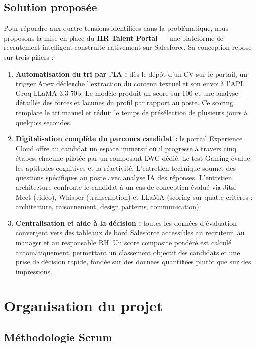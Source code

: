 \subsection{Solution proposée}

Pour répondre aux quatre tensions identifiées dans la problématique, nous proposons la mise en place du \textbf{HR Talent Portal} --- une plateforme de recrutement intelligent construite nativement sur Salesforce. Sa conception repose sur trois piliers :

\begin{enumerate}
    \item \textbf{Automatisation du tri par l'IA :} dès le dépôt d'un CV sur le portail, un trigger Apex déclenche l'extraction du contenu textuel et son envoi à l'API Groq LLaMA 3.3-70b. Le modèle produit un score sur 100 et une analyse détaillée des forces et lacunes du profil par rapport au poste. Ce scoring remplace le tri manuel et réduit le temps de présélection de plusieurs jours à quelques secondes.
    
    \item \textbf{Digitalisation complète du parcours candidat :} le portail Experience Cloud offre au candidat un espace immersif où il progresse à travers cinq étapes, chacune pilotée par un composant LWC dédié. Le test Gaming évalue les aptitudes cognitives et la réactivité. L'entretien technique soumet des questions spécifiques au poste avec analyse IA des réponses. L'entretien architecture confronte le candidat à un cas de conception évalué via Jitsi Meet (vidéo), Whisper (transcription) et LLaMA (scoring sur quatre critères : architecture, raisonnement, design patterns, communication).
    
    \item \textbf{Centralisation et aide à la décision :} toutes les données d'évaluation convergent vers des tableaux de bord Salesforce accessibles au recruteur, au manager et au responsable RH. Un score composite pondéré est calculé automatiquement, permettant un classement objectif des candidats et une prise de décision rapide, fondée sur des données quantifiées plutôt que sur des impressions.
\end{enumerate}

\section{Organisation du projet}

\subsection{Méthodologie Scrum}

